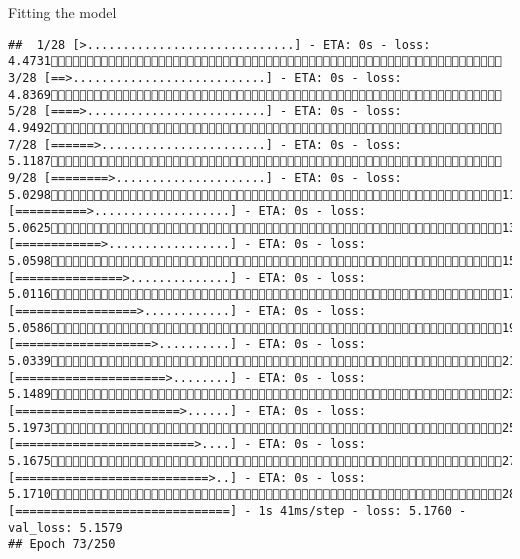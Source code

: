 \documentclass[
  ignorenonframetext,
]{beamer}
\begin{document}
\begin{frame}[fragile]{Fitting the model}
\begin{verbatim}
##  1/28 [>.............................] - ETA: 0s - loss: 4.4731 3/28 [==>...........................] - ETA: 0s - loss: 4.8369 5/28 [====>.........................] - ETA: 0s - loss: 4.9492 7/28 [======>.......................] - ETA: 0s - loss: 5.1187 9/28 [========>.....................] - ETA: 0s - loss: 5.029811/28 [==========>...................] - ETA: 0s - loss: 5.062513/28 [============>.................] - ETA: 0s - loss: 5.059815/28 [===============>..............] - ETA: 0s - loss: 5.011617/28 [=================>............] - ETA: 0s - loss: 5.058619/28 [===================>..........] - ETA: 0s - loss: 5.033921/28 [=====================>........] - ETA: 0s - loss: 5.148923/28 [=======================>......] - ETA: 0s - loss: 5.197325/28 [=========================>....] - ETA: 0s - loss: 5.167527/28 [===========================>..] - ETA: 0s - loss: 5.171028/28 [==============================] - 1s 41ms/step - loss: 5.1760 - val_loss: 5.1579
## Epoch 73/250

\end{verbatim}
\end{frame}
\end{document}
